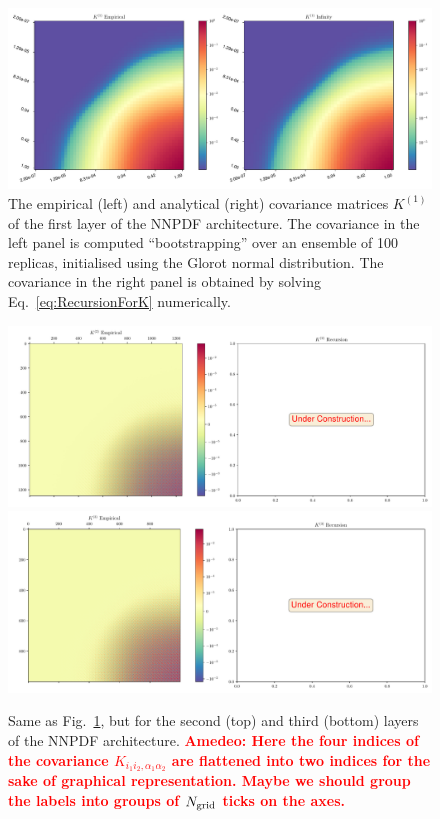 \documentclass[11pt]{article}
\newcommand{\ac}[1]{\textcolor{red}{\textbf{Amedeo: #1}}}
\begin{document}
\begin{figure}[t!]
    \centering
    \includegraphics[scale=0.4]{figs/K1_correlations.pdf}
    \caption{The empirical (left) and analytical (right) covariance matrices $K^{(1)}$ of the first layer
    of the NNPDF architecture. The covariance in the left panel is computed ``bootstrapping'' over an
    ensemble of 100 replicas, initialised using the Glorot normal distribution. The covariance in the right
    panel is obtained by solving Eq.~\eqref{eq:RecursionForK} numerically.
    \label{Fig:KRecursionOne}
    }
\end{figure}

\begin{figure}[t!]
    \centering
    \includegraphics[scale=0.4]{figs/K2_correlations.pdf}
    \includegraphics[scale=0.4]{figs/K3_correlations.pdf}
    \caption{Same as Fig.~\ref{Fig:KRecursionOne}, but for the second (top) and third (bottom) layers of the
    NNPDF architecture.
    \ac{Here the four indices of the covariance $K_{i_1i_2, \alpha_1\alpha_2}$ are flattened into
    two indices for the sake of graphical representation. Maybe we should group the labels into groups of
    $N_{\rm grid}$ ticks on the axes.}
    \label{Fig:KRecursionTwo}
    }
\end{figure}
\end{document}
